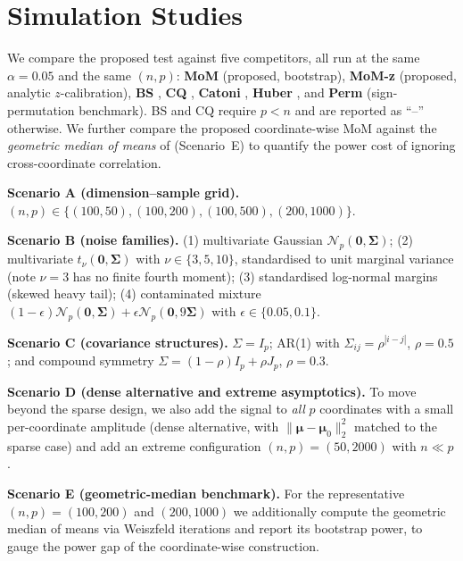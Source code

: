 \documentclass[pdflatex,sn-mathphys-num]{sn-jnl}
\newcommand{\bmu}{\boldsymbol{\mu}}
\newcommand{\bSig}{\boldsymbol{\Sigma}}
\newcommand{\bzero}{\mathbf{0}}
\newcommand{\normt}[1]{\lVert #1 \rVert_2}
\theoremstyle{thmstyleone}%
\theoremstyle{thmstyletwo}%
\theoremstyle{thmstylethree}%
\begin{document}
\section{Simulation Studies}
\label{sec:sim}

We compare the proposed test against five competitors, all run at the same
$\alpha=0.05$ and the same $(n,p)$:
\textbf{MoM} (proposed, bootstrap), \textbf{MoM-z} (proposed, analytic
$z$-calibration), \textbf{BS} \citep{bai1996}, \textbf{CQ} \citep{chen2010},
\textbf{Catoni} \citep{catoni2012,sun2018}, \textbf{Huber} \citep{huber1964},
and \textbf{Perm} (sign-permutation benchmark). BS and CQ require $p<n$ and are
reported as ``--'' otherwise. We further compare the proposed coordinate-wise
MoM against the \emph{geometric median of means} of \citeauthor{minsker2015} \citep{minsker2015}
(Scenario~E) to quantify the power cost of ignoring cross-coordinate correlation.

\textbf{Scenario A (dimension--sample grid).}
$(n,p)\in\{(100,50),(100,200),(100,500),(200,1000)\}$.

\textbf{Scenario B (noise families).}
(1) multivariate Gaussian $\mathcal{N}_p(\bzero,\bSig)$;
(2) multivariate $t_\nu(\bzero,\bSig)$ with $\nu\in\{3,5,10\}$, standardised to
unit marginal variance (note $\nu=3$ has no finite fourth moment);
(3) standardised log-normal margins (skewed heavy tail);
(4) contaminated mixture
$(1-\epsilon)\mathcal{N}_p(\bzero,\bSig)+\epsilon\mathcal{N}_p(\bzero,9\bSig)$
with $\epsilon\in\{0.05,0.1\}$.

\textbf{Scenario C (covariance structures).}
$\Sigma=I_p$; AR(1) with $\Sigma_{ij}=\rho^{|i-j|}$, $\rho=0.5$; and compound
symmetry $\Sigma=(1-\rho)I_p+\rho J_p$, $\rho=0.3$.

\textbf{Scenario D (dense alternative and extreme asymptotics).}
To move beyond the sparse design, we also add the signal to \emph{all} $p$
coordinates with a small per-coordinate amplitude (dense alternative, with
$\normt{\bmu-\bmu_0}^2$ matched to the sparse case) and add an extreme
configuration $(n,p)=(50,2000)$ with $n\ll p$.

\textbf{Scenario E (geometric-median benchmark).}
For the representative $(n,p)=(100,200)$ and $(200,1000)$ we additionally
compute the geometric median of means \citep{minsker2015,minsker2025} via
Weiszfeld iterations and report its bootstrap power, to gauge the power gap of
the coordinate-wise construction.
\end{document}
